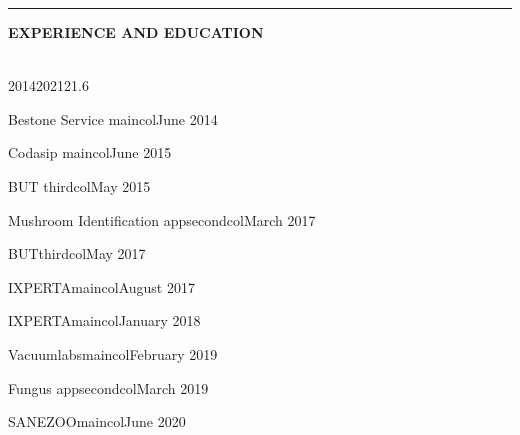 \documentclass[10pt,A4]{article}
\newcommand{\cvsection}[2] {
\textcolor{sectcol}{\uppercase{\textbf{#1}}}
}
\newcommand{\cvsect}[4]{
	\textcolor{#3}{\hrule}
	\colorbox{#3}{ {\cvsection{#1}{#4}}}
}
\begin{document}
\begin{minipage}{0.4\textwidth}
	\vspace{56pt}
	\cvsect{Experience and Education}{0.4}{thirdcol}{textcol}\\[16pt]
	
	\hspace{60pt}\mbox{  }
	\vspace{-50pt}
	\begin{center}
		
		\begin{cvtimeline}{2014}{2021}{21.6}%
			
			
			
			{Bestone Service}
			{maincol}{June 2014}
			
			{Codasip}
			{maincol}{June 2015}
			
			{BUT}
			{thirdcol}{May 2015}
			
			{Mushroom Identification app}{secondcol}{March 2017}
			
			{BUT}{thirdcol}{May 2017}
			
			{IXPERTA}{maincol}{August 2017}
			
			{IXPERTA}{maincol}{January 2018}
			    
			{Vacuumlabs}{maincol}{February 2019}    
			
			{Fungus app}{secondcol}{March 2019}
			
			{SANEZOO}{maincol}{June 2020}
			     
		\end{cvtimeline}
	\end{center}
\end{minipage}

\newpage
\newcommand{\cvsecta}[1]{%
	\vspace{\baselineskip} %
	\colorbox{thirdcol}{\textcolor{white}{\MakeUppercase{\textbf{#1}}}}\\%
}
\end{document}
